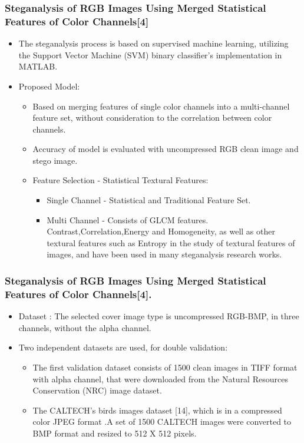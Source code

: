 \documentclass{beamer} %
\theoremstyle{definition} %
\begin{document}
\begin{frame}
\frametitle{Steganalysis of RGB Images Using Merged Statistical Features of Color Channels[4]  }
\begin{itemize}
	\item The steganalysis process is based on supervised machine learning, utilizing the Support Vector Machine (SVM) binary classifier’s implementation in MATLAB. 
	\item Proposed Model:
	\begin{itemize}
        \item{Based on merging features of single color channels into a multi-channel feature set, without consideration to the correlation between color channels.}
        \item{Accuracy of model is evaluated with uncompressed RGB clean image and stego image.}
     \item Feature Selection - Statistical Textural Features:
     \begin{itemize}
     	\item Single Channel - Statistical and Traditional Feature Set. 
     	\item Multi Channel -  Consists of GLCM features. Contrast,Correlation,Energy and Homogeneity, as well as other textural features such as Entropy in the study of textural features of images, and have been used in many steganalysis research works.
     \end{itemize}
	\end{itemize}
\end{itemize}
\end{frame}
\iffalse
\begin{frame}
\frametitle{Single Channel Features in Statistical Textural Features.  }
\texttt{[image: singleChannelFeatures.png]}
\end{frame}
\fi
\begin{frame}
\frametitle{Steganalysis of RGB Images Using Merged Statistical Features of Color Channels[4].  }
\begin{itemize}
	\item Dataset :  The selected cover image type is uncompressed RGB-BMP, in three channels, without the alpha channel.
	\item Two independent datasets are used, for double validation:
	\begin{itemize}
		\item The first validation dataset consists of 1500 clean images in TIFF format with alpha channel, that were downloaded from the Natural Resources Conservation (NRC) image dataset.
	    \item  The CALTECH’s birds images dataset [14], which is in a compressed color JPEG format .A set of 1500 CALTECH images were converted to BMP format and resized to 512 X 512 pixels.
	\end{itemize}
\end{itemize}
\end{frame}
\end{document}
